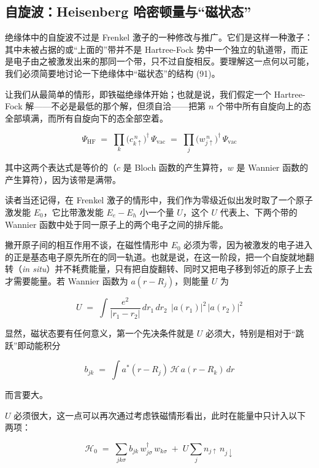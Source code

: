 \subsection{自旋波：Heisenberg 哈密顿量与“磁状态”}

绝缘体中的自旋波不过是 Frenkel 激子的一种修改与推广。它们是这样一种激子：其中未被占据的或“上面的”带并不是 Hartree-Fock 势中一个独立的轨道带，而正是电子由之被激发出来的那同一个带，只不过自旋相反。要理解这一点何以可能，我们必须简要地讨论一下绝缘体中“磁状态”的结构 (91)。

让我们从最简单的情形，即铁磁绝缘体开始；也就是说，我们假定一个 Hartree-Fock 解——不必是最低的那个解，但须自洽——把第 $n$ 个带中所有自旋向上的态全部填满，而所有自旋向下的态全部空着。

\begin{equation*}
\Psi_{\mathrm{HF}} \;=\; \prod_k \bigl(c^{\,n}_{k\uparrow}\bigr)^{\dagger}\, \Psi_{\mathrm{vac}} \;=\; \prod_j \bigl(w^{\,n}_{j\uparrow}\bigr)^{\dagger}\, \Psi_{\mathrm{vac}}
\end{equation*}

其中这两个表达式是等价的（$c$ 是 Bloch 函数的产生算符，$w$ 是 Wannier 函数的产生算符），因为该带是满带。

读者当还记得，在 Frenkel 激子的情形中，我们作为零级近似出发时取了一个原子激发能 $E_0$，它比带激发能 $E_e - E_h$ 小一个量 $U$，这个 $U$ 代表上、下两个带的 Wannier 函数中处于同一原子上的两个电子之间的排斥能。

撇开原子间的相互作用不谈，在磁性情形中 $E_0$ 必须为零，因为被激发的电子进入的正是基态电子原先所在的同一轨道。也就是说，在这一阶段，把一个自旋就地翻转（\emph{in situ}）并不耗费能量，只有把自旋翻转、同时又把电子移到邻近的原子上去才需要能量。若 Wannier 函数为 $a(r-R_j)$，则能量 $U$ 为

\begin{equation*}
U \;=\; \int \frac{e^{2}}{|r_1 - r_2|}\, dr_1\, dr_2\;\, |a(r_1)|^{2}\, |a(r_2)|^{2}
\end{equation*}

显然，磁状态要有任何意义，第一个先决条件就是 $U$ 必须大，特别是相对于“跳跃”即动能积分

\begin{equation*}
b_{jk} \;=\; \int a^{*}(r-R_j)\, \mathcal{H}\, a(r-R_k)\, dr
\end{equation*}

而言要大。

$U$ 必须很大，这一点可以再次通过考虑铁磁情形看出，此时在能量中只计入以下两项：

\begin{equation*}
\mathcal{H}_0 \;=\; \sum_{jk\sigma} b_{jk}\, w^{\dagger}_{j\sigma}\, w_{k\sigma} \;+\; U \sum_j n_{j\uparrow}\, n_{j\downarrow}
\end{equation*}

